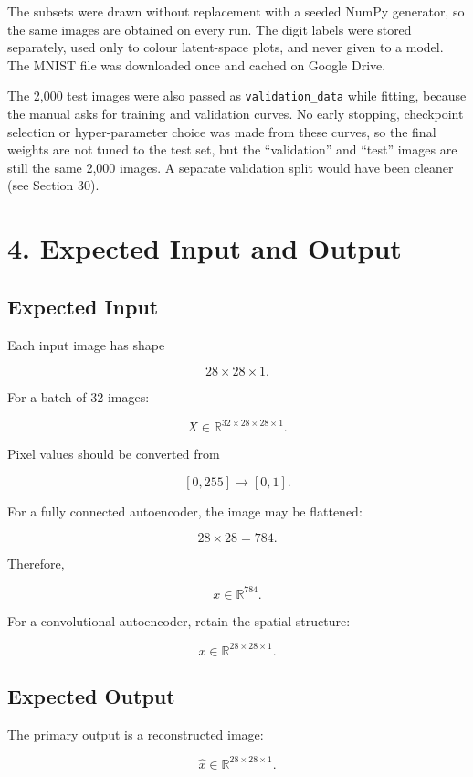 \documentclass[10pt]{article}
\begin{document}
The subsets were drawn without replacement with a seeded NumPy generator, so the
same images are obtained on every run. The digit labels were stored separately,
used only to colour latent-space plots, and never given to a model. The MNIST
file was downloaded once and cached on Google Drive.

The 2,000 test images were also passed as \texttt{validation\_data} while
fitting, because the manual asks for training and validation curves. No early
stopping, checkpoint selection or hyper-parameter choice was made from these
curves, so the final weights are not tuned to the test set, but the
``validation'' and ``test'' images are still the same 2,000 images. A separate
validation split would have been cleaner (see Section 30).

\section*{4. Expected Input and Output}

\subsection*{Expected Input}

Each input image has shape

\[
28\times28\times1.
\]

For a batch of 32 images:

\[
X\in\mathbb{R}^{32\times28\times28\times1}.
\]

Pixel values should be converted from

\[
[0,255]\rightarrow[0,1].
\]

For a fully connected autoencoder, the image may be flattened:

\[
28\times28=784.
\]

Therefore,

\[
x\in\mathbb{R}^{784}.
\]

For a convolutional autoencoder, retain the spatial structure:

\[
x\in\mathbb{R}^{28\times28\times1}.
\]

\subsection*{Expected Output}

The primary output is a reconstructed image:

\[
\hat{x}\in\mathbb{R}^{28\times28\times1}.
\]
\end{document}

